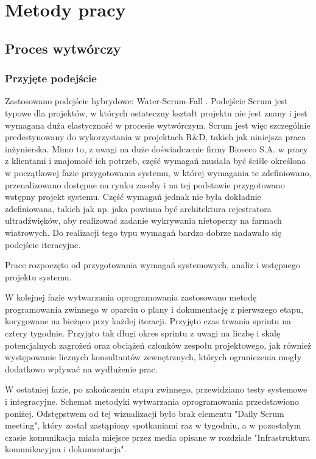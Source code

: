 \documentclass{sprz}
\begin{document}
\chapter{Metody pracy}



\section{Proces wytwórczy}

\subsection{Przyjęte podejście}
Zastosowano podejście hybrydowe: Water-Scrum-Fall \cite{water-scrum-fall1} \cite{water-scrum-fall2} \cite{water-scrum-fall3}. Podejście Scrum jest typowe dla projektów, w których ostateczny kształt projektu nie jest znany i jest wymagana duża elastyczność w procesie wytwórczym. Scrum jest więc szczególnie predestynowany do wykorzystania w projektach R\&D, takich jak niniejsza praca inżynierska. Mimo to, z uwagi na duże doświadczenie firmy Bioseco S.A. w pracy z klientami i znajomość ich potrzeb, część wymagań musiała być ściśle określona w początkowej fazie przygotowania systemu, w której wymagania te zdefiniowano, przenalizowano dostępne na rynku zasoby i na tej podstawie przygotowano wstępny projekt systemu. Część wymagań jednak nie była dokładnie zdefiniowana, takich jak np. jaka powinna być architektura rejestratora ultradźwięków, aby realizować zadanie wykrywania nietoperzy na farmach wiatrowych. Do realizacji tego typu wymagań bardzo dobrze nadawało się podejście iteracyjne.

Prace rozpoczęto od przygotowania wymagań systemowych, analiz i wstępnego projektu systemu. 

W kolejnej fazie wytwarzania oprogramowania zastosowano metodę programowania zwinnego w oparciu o plany i dokumentację z pierwszego etapu, korygowane na bieżąco przy każdej iteracji. Przyjęto czas trwania sprintu na cztery tygodnie. Przyjąto tak długi okres sprintu z uwagi na liczbę i skalę potencjalnych zagrożeń oraz obciążeń członków zespołu projektowego, jak również występowanie licznych konsultantów zewnętrznych, których ograniczenia mogły dodatkowo wpływać na wydłużenie prac. 

W ostatniej fazie, po zakończeniu etapu zwinnego, przewidziano testy systemowe i integracyjne. Schemat metodyki wytwarzania oprogramowania przedstawiono poniżej. Odstępstwem od tej wizualizacji było brak elementu "Daily Scrum meeting", który został zastąpiony spotkaniami raz w tygodniu, a w pozostałym czasie komunikacja miała miejsce przez media opisane w rozdziale "Infrastruktura komunikacyjna i dokumentacja". 
\end{document}
